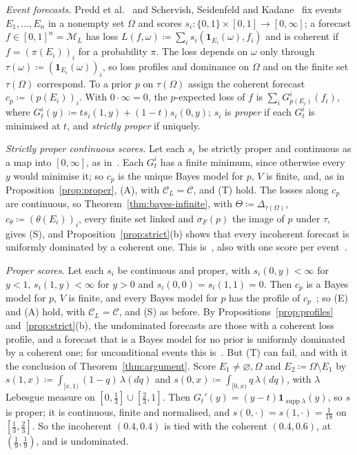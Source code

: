 \documentclass[11pt]{article}
\theoremstyle{definition}
\theoremstyle{remark}
\newcommand{\M}{\mathcal M}
\newcommand{\C}{\mathcal C}
\newcommand{\one}{\mathbf 1}
\newcommand{\supp}{\operatorname{supp}}
\begin{document}
\emph{Event forecasts.} Predd et al.~\cite{Predd} and Schervish, Seidenfeld and Kadane~\cite{SSK09} fix events $E_1,\dots,E_n$ in a nonempty set $\Omega$ and scores $s_i:\{0,1\}\times[0,1]\to[0,\infty]$; a forecast $f\in[0,1]^n=\M_L$ has loss $L(f,\omega)\coloneqq\sum_is_i(\one_{E_i}(\omega),f_i)$ and is coherent if $f=(\pi(E_i))_i$ for a probability $\pi$. The loss depends on $\omega$ only through $\tau(\omega)\coloneqq(\one_{E_i}(\omega))_i$, so loss profiles and dominance on $\Omega$ and on the finite set $\tau(\Omega)$ correspond. To a prior $p$ on $\tau(\Omega)$ assign the coherent forecast $c_p\coloneqq(p(E_i))_i$. With $0\cdot\infty=0$, the $p$-expected loss of $f$ is $\sum_iG^i_{p(E_i)}(f_i)$, where $G^i_t(y)\coloneqq ts_i(1,y)+(1-t)s_i(0,y)$; $s_i$ is \emph{proper} if each $G^i_t$ is minimised at $t$, and \emph{strictly proper} if uniquely.

\emph{Strictly proper continuous scores.} Let each $s_i$ be strictly proper and continuous as a map into $[0,\infty]$, as in~\cite[Definition~2]{Predd}. Each $G^i_t$ has a finite minimum, since otherwise every $y$ would minimise it; so $c_p$ is the unique Bayes model for $p$, $V$ is finite, and, as in Proposition~\ref{prop:proper}, (A), with $\C_L=\C$, and (T) hold. The losses along $c_p$ are continuous, so Theorem~\ref{thm:bayes-infinite}, with $\Theta\coloneqq\Delta_{\tau(\Omega)}$, $c_\theta\coloneqq(\theta(E_i))_i$, every finite set linked and $\sigma_F(p)$ the image of $p$ under $\tau$, gives (S), and Proposition~\ref{prop:strict}(b) shows that every incoherent forecast is uniformly dominated by a coherent one. This is~\cite[Theorem~1]{Predd}, also with one score per event~\cite[Section~VII.A]{Predd}.

\emph{Proper scores.} Let each $s_i$ be continuous and proper, with $s_i(0,y)<\infty$ for $y<1$, $s_i(1,y)<\infty$ for $y>0$ and $s_i(0,0)=s_i(1,1)=0$. Then $c_p$ is a Bayes model for $p$, $V$ is finite, and every Bayes model for $p$ has the profile of $c_p$~\cite[Lemma~5]{SSK09}; so (E) and (A) hold, with $\C_L=\C$, and (S) as before. By Propositions~\ref{prop:profiles} and~\ref{prop:strict}(b), the undominated forecasts are those with a coherent loss profile, and a forecast that is a Bayes model for no prior is uniformly dominated by a coherent one; for unconditional events this is~\cite[Theorem~2, Conclusion~3]{SSK09}. But (T) can fail, and with it the conclusion of Theorem~\ref{thm:argument}. Score $E_1\ne\varnothing,\Omega$ and $E_2\coloneqq\Omega\setminus E_1$ by $s(1,x)\coloneqq\int_{[x,1)}(1-q)\,\lambda(dq)$ and $s(0,x)\coloneqq\int_{[0,x)}q\,\lambda(dq)$, with $\lambda$ Lebesgue measure on $[0,\frac13]\cup[\frac23,1]$. Then $G_t'(y)=(y-t)\one_{\supp\lambda}(y)$, so $s$ is proper; it is continuous, finite and normalised, and $s(0,\cdot)=s(1,\cdot)=\frac1{18}$ on $[\frac13,\frac23]$. So the incoherent $(0.4,0.4)$ is tied with the coherent $(0.4,0.6)$, at $(\frac19,\frac19)$, and is undominated.
\end{document}
